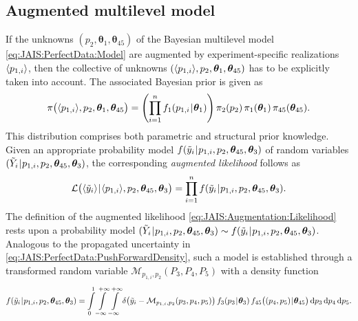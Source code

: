 \subsection{Augmented multilevel model}
If the unknowns \((p_2,\bm{\theta}_1,\bm{\theta}_{45})\) of the Bayesian multilevel model \cref{eq:JAIS:PerfectData:Model} are augmented by experiment-specific realizations \(\langle{p_{1,i}}\rangle\),
then the collective of unknowns \((\langle{p_{1,i}}\rangle,p_2,\bm{\theta}_1,\bm{\theta}_{45})\) has to be explicitly taken into account.
The associated Bayesian prior is given as
\begin{equation} \label{eq:JAIS:Augmentation:Prior}
  \pi \big( \langle{p_{1,i}}\rangle,p_2,\bm{\theta}_1,\bm{\theta}_{45} \big)
  = \left( \prod\limits_{i=1}^n f_1(p_{1,i} {\:\!}|{\:\!} \bm{\theta}_1) \right)
  \pi_2(p_2) \, \pi_1(\bm{\theta}_1) \, \pi_{45}(\bm{\theta}_{45}).
\end{equation}
This distribution comprises both parametric and structural prior knowledge.
Given an appropriate probability model \(f(\tilde{y}_i {\:\!}|{\:\!} p_{1,i},p_2,\bm{\theta}_{45},\bm{\theta}_3)\) of random variables
\((\tilde{Y}_i {\:\!}|{\:\!} p_{1,i},p_2,\bm{\theta}_{45},\bm{\theta}_3)\),
the corresponding \textit{augmented likelihood} follows as
\begin{equation} \label{eq:JAIS:Augmentation:Likelihood}
  \mathcal{L} \big( \langle{\tilde{y}_i}\rangle {\:\!}|{\:\!} \langle{p_{1,i}}\rangle,p_2,\bm{\theta}_{45},\bm{\theta}_3 \big)
  = \prod\limits_{i=1}^n f (\tilde{y}_i {\:\!}|{\:\!} p_{1,i},p_2,\bm{\theta}_{45}, \bm{\theta}_3).
\end{equation}
The definition of the augmented likelihood \cref{eq:JAIS:Augmentation:Likelihood} rests upon a probability model
\((\tilde{Y}_i {\:\!}|{\:\!} p_{1,i},p_2,\bm{\theta}_{45},\bm{\theta}_3) \sim f(\tilde{y}_i {\:\!}|{\:\!} p_{1,i},p_2,\bm{\theta}_{45},\bm{\theta}_3)\).
Analogous to the propagated uncertainty in \cref{eq:JAIS:PerfectData:PushForwardDensity}, such a model is established through a transformed random variable \(\mathcal{M}_{p_{1,i},p_2} (P_3,P_4,P_5)\) with a density function
\begin{equation} \label{eq:JAIS:Augmentation:PushForwardDensity}
  f (\tilde{y}_i {\:\!}|{\:\!} p_{1,i},p_2,\bm{\theta}_{45},\bm{\theta}_3)
  = \int\limits_{0}^{1} \int\limits_{-\infty}^{+\infty} \int\limits_{-\infty}^{+\infty} \delta \big( \tilde{y}_i - \mathcal{M}_{p_{1,i},p_2} (p_3,p_4,p_5) \big)
  \, f_3(p_{3} {\:\!}|{\:\!} \bm{\theta}_3) \, f_{45} \big( (p_{4},p_{5}) {\:\!}|{\:\!} \bm{\theta}_{45} \big)
  \, \mathrm{d} p_3 \, \mathrm{d} p_4 \, \mathrm{d} p_5.
\end{equation}
